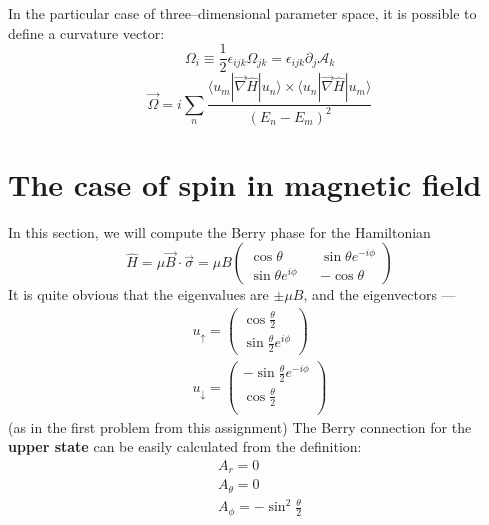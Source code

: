\documentclass{article}
\begin{document}
In the particular case of three--dimensional parameter space, it is possible to define
a curvature vector:
\begin{equation}
    \Omega_i \equiv \frac{1}{2} \epsilon_{ijk}\Omega_{jk} = 
                    \epsilon_{ijk} \partial_j \mathcal{A}_k 
\end{equation}
\begin{equation}
    \vec{\Omega} = i\sum_{n} \frac{\langle u_m | \vec\nabla\hat{H} | u_n \rangle  \times
                                  \langle u_n | \vec\nabla\hat{H} | u_m \rangle}
                                  {(E_n - E_m)^2}
\end{equation}
\section{The case of spin in magnetic field}
In this section, we will compute the Berry phase for the Hamiltonian
\begin{equation}
    \hat{H} = \mu \vec{B}\cdot \vec{\sigma} = 
                \mu B\begin{pmatrix}
                        \cos{\theta} && \sin{\theta}e^{-i\phi} \\
                        \sin{\theta}e^{i\phi} && -\cos{\theta}
                     \end{pmatrix}
\end{equation}
It is quite obvious that the eigenvalues are $\pm \mu B$, and the eigenvectors ---
\begin{equation}
    \begin{gathered}
        u_\uparrow = \begin{pmatrix}
                        \cos{\frac{\theta}{2}} \\
                        \sin{\frac{\theta}{2}e^{i\phi}}
                    \end{pmatrix}\\
        u_\downarrow = \begin{pmatrix}
                        -\sin{\frac{\theta}{2}e^{-i\phi}}\\
                        \cos{\frac{\theta}{2}} \\
                    \end{pmatrix}
    \end{gathered}
\end{equation}
(as in the first problem from this assignment)
The Berry connection for the {\bf upper state} can be easily calculated from the definition:
\begin{equation}
    \begin{gathered}
        A_r = 0\\
        A_\theta = 0\\
        A_\phi = -\sin^2{\frac{\theta}{2}}
    \end{gathered}
\end{equation}
\end{document}
